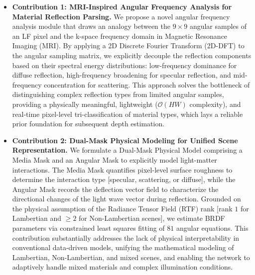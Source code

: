 \documentclass[lettersize,journal]{IEEEtran}
\begin{document}
\begin{itemize}\item \textbf{Contribution 1: MRI-Inspired Angular Frequency Analysis for Material Reflection Parsing.} We propose a novel angular frequency analysis module that draws an analogy between the $9 \times 9$ angular samples of an LF pixel and the k-space frequency domain in Magnetic Resonance Imaging (MRI). By applying a 2D Discrete Fourier Transform (2D-DFT) to the angular sampling matrix, we explicitly decouple the reflection components based on their spectral energy distributions: low-frequency dominance for diffuse reflection, high-frequency broadening for specular reflection, and mid-frequency concentration for scattering. This approach solves the bottleneck of distinguishing complex reflection types from limited angular samples, providing a physically meaningful, lightweight ($\mathcal{O}(HW)$ complexity), and real-time pixel-level tri-classification of material types, which lays a reliable prior foundation for subsequent depth estimation.\end{itemize}

\begin{itemize}\item \textbf{Contribution 2: Dual-Mask Physical Modeling for Unified Scene Representation.} We formulate a Dual-Mask Physical Model comprising a Media Mask and an Angular Mask to explicitly model light-matter interactions. The Media Mask quantifies pixel-level surface roughness to determine the interaction type  [specular, scattering, or diffuse], while the Angular Mask records the deflection vector field to characterize the directional changes of the light wave vector during reflection. Grounded on the physical assumption of the Radiance Tensor Field (RTF) rank  [rank $1$ for Lambertian and $\ge 2$ for Non-Lambertian scenes], we estimate BRDF parameters via constrained least squares fitting of $81$ angular equations. This contribution substantially addresses the lack of physical interpretability in conventional data-driven models, unifying the mathematical modeling of Lambertian, Non-Lambertian, and mixed scenes, and enabling the network to adaptively handle mixed materials and complex illumination conditions.\end{itemize}
\end{document}
